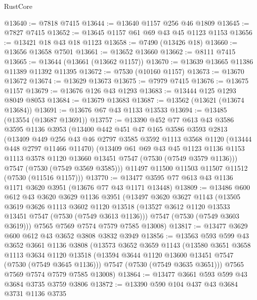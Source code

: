 \begin{lexlean}{RustCore}
\begin{coremodule}
@13640 := @7818 @7415
@13644 := @13640 @1157 @256 @46 @1809
@13645 := @7827 @7415
@13652 := @13645 @1157 @61 @69 @43 @45 @1123 @1153
@13656 := @13421 @18 @43 @18 @1123
@13658 := @7490 (@13426 @18)
@13660 := @13656 @13658 @7501
@13661 := @13652 @13660
@13662 := @8111 @7415
@13665 := @13644 (@13661 (@13662 @1157))
@13670 := @13639 @13665 @11386 @11389 @11392 @11395
@13672 := @7530 (@10160 @1157)
@13673 := @13670 @13672
@13674 := @13629 @13673
@13675 := @7979 @7415
@13676 := @13675 @1157
@13679 := @13676 @126 @43 @1293
@13683 := @13444 @125 @1293 @8049 @8053
@13684 := @13679 @13683
@13687 := @13562 (@13621 (@13674 @13684))
@13691 := @13676 @67 @43 @1133 @13533
@13694 := @13485 (@13554 (@13687 @13691))
@13757 := @13390
    @452
    @77
    @613
    @43
    @3586
    @3595
    @1136
    @3953
    (@13400
      @442
      @451
      @47
      @165
      @3586
      @3593
      @2813
      (@13409
        @449
        @256
        @43
        @46
        @2797
        @3585
        @3592
        @1113
        @3568
        @1120
        (@13444 @448 @2797 @11466 @11470)
        (@13409
          @61
          @69
          @43
          @45
          @1123
          @1136
          @1153
          @1113
          @3578
          @1120
          @13660
          @13451
          @7547
          (@7530 (@7549 @3579 @1136)))
        @7547
        (@7530 (@7549 @3569 @3585)))
      @11497
      @11500
      @11503
      @11507
      @11512
      (@7530 (@11516 @1157)))
@13770 := @13477 @3595 @77 @613 @43 @1136 @1171 @3620 @3951 (@13676 @77 @43 @1171 @13448)
@13809 := @13486
    @600
    @612
    @43
    @3620
    @3629
    @1136
    @3951
    (@13497
      @3620
      @3627
      @1143
      (@13505
        @3619
        @3626
        @1113
        @3602
        @1120
        @13518
        (@13527 @3612 @1120 @13533 @13451 @7547 (@7530 (@7549 @3613 @1136)))
        @7547
        (@7530 (@7549 @3603 @3619)))
      @7565
      @7569
      @7574
      @7579
      @7585
      @13008)
@13817 := @13477 @3629 @600 @612 @43 @3652 @3808 @3832 @3949
@13856 := @13563
    @593
    @599
    @43
    @3652
    @3661
    @1136
    @3808
    (@13573
      @3652
      @3659
      @1143
      (@13580
        @3651
        @3658
        @1113
        @3634
        @1120
        @13518
        (@13594 @3644 @1120 @13600 @13451 @7547 (@7530 (@7549 @3645 @1136)))
        @7547
        (@7530 (@7549 @3635 @3651)))
      @7565
      @7569
      @7574
      @7579
      @7585
      @13008)
@13864 := @13477 @3661 @593 @599 @43 @3684 @3735 @3759 @3806
@13872 := @13390 @590 @104 @437 @43 @3684 @3731 @1136 @3735

\end{coremodule}
\end{lexlean}
